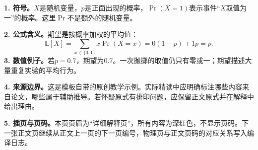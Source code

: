 \textbf{1. 符号。}\(X\)是随机变量，\(p\)是正面出现的概率，\(\Pr(X=1)\)表示事件“\(X\)取值为一”的概率。这里\(\Pr\)不是额外的随机变量。
\par\medskip
\textbf{2. 公式含义。}期望是按概率加权的平均值：
\[
  \mathbb{E}[X]=\sum_{x\in\{0,1\}}x\Pr(X=x)
                =0(1-p)+1p=p.
\]
\textbf{3. 数值例子。}若\(p=0.7\)，期望为\(0.7\)。一次抛掷的取值仍只有零或一；期望描述大量重复实验的平均行为。
\par\medskip
\textbf{4. 来源边界。}这是模板自带的原创教学示例。实际精读中应明确标注哪些内容来自论文，哪些属于辅助推导。若怀疑原式有排印问题，应保留正文原式并在解释中给出理由。
\par\medskip
\textbf{5. 插页与页码。}本页页眉为“详细解释页”，所有内容为深红色，不显示页码。下一张正文页继续从正文上一页的下一页编号，物理页与正文页码的对应关系写入编译日志。
